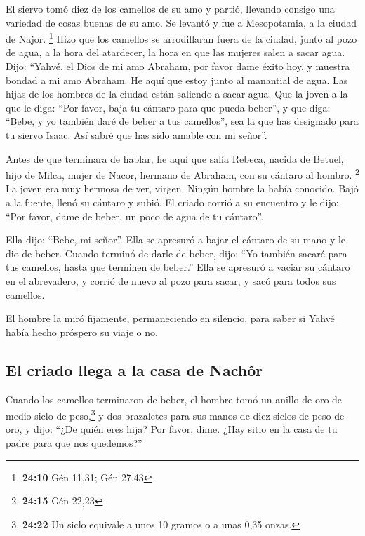 \begin{paracol}{2}
 El siervo tomó diez de los camellos de su amo y partió,
llevando consigo una variedad de cosas buenas de su amo. Se levantó y
fue a Mesopotamia, a la ciudad de Najor. \footnote{\textbf{24:10} Gén
  11,31; Gén 27,43}  Hizo que los camellos se
arrodillaran fuera de la ciudad, junto al pozo de agua, a la hora del
atardecer, la hora en que las mujeres salen a sacar agua.
 Dijo: ``Yahvé, el Dios de mi amo Abraham, por favor dame
éxito hoy, y muestra bondad a mi amo Abraham.  He aquí
que estoy junto al manantial de agua. Las hijas de los hombres de la
ciudad están saliendo a sacar agua.  Que la joven a la
que le diga: ``Por favor, baja tu cántaro para que pueda beber'', y que
diga: ``Bebe, y yo también daré de beber a tus camellos'', sea la que
has designado para tu siervo Isaac. Así sabré que has sido amable con mi
señor''.

 Antes de que terminara de hablar, he aquí que salía
Rebeca, nacida de Betuel, hijo de Milca, mujer de Nacor, hermano de
Abraham, con su cántaro al hombro. \footnote{\textbf{24:15} Gén 22,23}
 La joven era muy hermosa de ver, virgen. Ningún hombre
la había conocido. Bajó a la fuente, llenó su cántaro y subió.
 El criado corrió a su encuentro y le dijo: ``Por favor,
dame de beber, un poco de agua de tu cántaro''.

 Ella dijo: ``Bebe, mi señor''. Ella se apresuró a bajar
el cántaro de su mano y le dio de beber.  Cuando terminó
de darle de beber, dijo: ``Yo también sacaré para tus camellos, hasta
que terminen de beber.''  Ella se apresuró a vaciar su
cántaro en el abrevadero, y corrió de nuevo al pozo para sacar, y sacó
para todos sus camellos.

 El hombre la miró fijamente, permaneciendo en silencio,
para saber si Yahvé había hecho próspero su viaje o no.

\hypertarget{el-criado-llega-a-la-casa-de-nachuxf4r}{%
\subsection{El criado llega a la casa de
Nachôr}\label{el-criado-llega-a-la-casa-de-nachuxf4r}}

 Cuando los camellos terminaron de beber, el hombre tomó
un anillo de oro de medio siclo de peso,\footnote{\textbf{24:22} Un
  siclo equivale a unos 10 gramos o a unas 0,35 onzas.} y dos brazaletes
para sus manos de diez siclos de peso de oro,  y dijo:
``¿De quién eres hija? Por favor, dime. ¿Hay sitio en la casa de tu
padre para que nos quedemos?''


\end{paracol}
